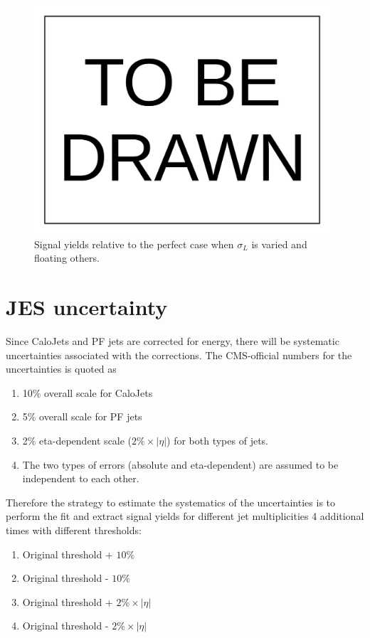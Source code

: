 \documentclass[10pt,a4paper,onecolumn]{article}
\begin{document}
\begin{figure}
\includegraphics[width=110mm]{ToBeDrawn.pdf}
\caption{Signal yields relative to the perfect case when $\sigma_L$ is varied and floating others.}
\label{Figure_RelativeYieldChangingAlphaLFloatingOthers}
\end{figure}


\section{JES uncertainty}

Since CaloJets and PF jets are corrected for energy, there will be systematic uncertainties associated with the corrections.
The CMS-official numbers for the uncertainties is quoted as

\begin{enumerate}
\item 10\% overall scale for CaloJets
\item 5\% overall scale for PF jets
\item 2\% eta-dependent scale ($2\% \times |\eta|$) for both types of jets.
\item The two types of errors (absolute and eta-dependent) are assumed to be independent to each other.
\end{enumerate}

Therefore the strategy to estimate the systematics of the uncertainties is to perform the fit and extract signal yields for different jet multiplicities 4 additional times with different thresholds:

\begin{enumerate}
\item Original threshold + $10\%$
\item Original threshold - $10\%$
\item Original threshold + $2\% \times |\eta|$
\item Original threshold - $2\% \times |\eta|$
\end{enumerate}
\end{document}
